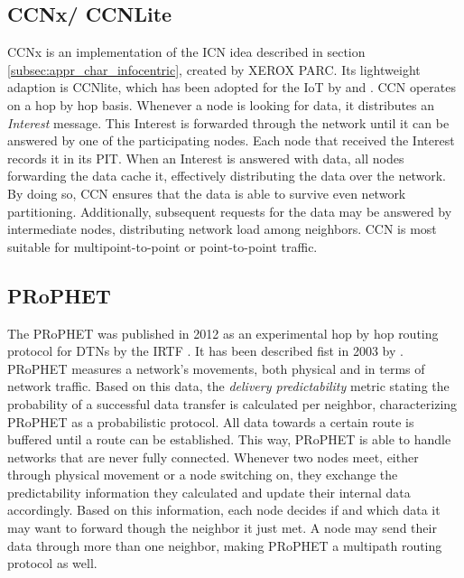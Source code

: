 \subsection{CCNx/ CCNLite}
\label{subsec:ndn}
CCNx is an implementation of the ICN idea described in section \ref{subsec:appr_char_infocentric}, created by XEROX PARC.%
Its lightweight adaption is CCNlite, which has been adopted for the \gls{IoT} by \cite{gerla_tactical_iot} and \cite{mehlis_ccn_iot}. CCN operates on a hop by hop basis.
Whenever a node is looking for data, it distributes an \emph{Interest} message. This Interest is forwarded through the network until it can be answered by one of the participating nodes. Each node that received the Interest records it in its \gls{PIT}. When an Interest is answered with data, all nodes forwarding the data cache it, effectively distributing the data over the network. By doing so, CCN ensures that the data is able to survive even network partitioning. Additionally, subsequent requests for the data may be answered by intermediate nodes, distributing network load among neighbors. CCN is most suitable for multipoint-to-point or point-to-point traffic.



\subsection{PRoPHET}
\label{subsec:prophet}

The \gls{PRoPHET} was published in 2012 as an experimental hop by hop routing protocol for \glspl{DTN} by the \gls{IRTF} \cite{rfc6693}. It has been described fist in 2003 by \cite{prophetpaper}.\\
PRoPHET measures a network's movements, both physical and in terms of network traffic. Based on this data, the \emph{delivery predictability} metric stating the probability of a successful data transfer is calculated per neighbor, characterizing PRoPHET as a probabilistic protocol.
All data towards a certain route is buffered until a route can be established. This way, PRoPHET is able to handle networks that are never fully connected.
Whenever two nodes meet, either through physical movement or a node switching on, they exchange the predictability information they calculated and update their internal data accordingly. Based on this information, each node decides if and which data it may want to forward though the neighbor it just met.
A node may send their data through more than one neighbor, making PRoPHET a multipath routing protocol as well.

